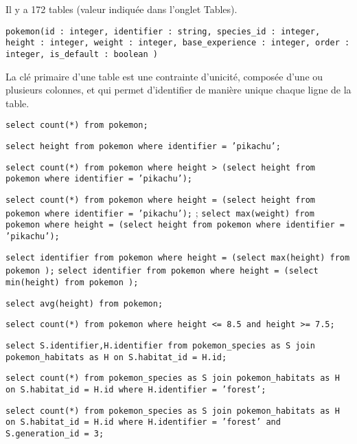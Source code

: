 \question{}
Il y a 172 tables (valeur indiquée dans l'onglet Tables).

\question{}
\texttt{pokemon(id : integer, identifier : string, species\_id : integer, height : integer, weight : integer, base\_experience : integer, order : integer, is\_default : boolean )} 

\question{}
La clé primaire d'une table est une contrainte d'unicité, composée d'une ou plusieurs colonnes, et qui permet d'identifier de manière unique chaque ligne de la table.


\question{}
\texttt{select count(*) from pokemon;}  

\question{}
\texttt{select height from pokemon where identifier = 'pikachu';}  

\question{}
\texttt{select count(*) from pokemon where height > (select height from pokemon where identifier = 'pikachu');}  

\question{}
\texttt{select count(*) from pokemon where height = (select height from pokemon where identifier = 'pikachu');}  ;
\texttt{select max(weight) from pokemon where height = (select height from pokemon where identifier = 'pikachu');} 

\question{}
\texttt{select identifier from pokemon where height = (select max(height) from pokemon );} 
\texttt{select identifier from pokemon where height = (select min(height) from pokemon );}  

\question{}
\texttt{select avg(height) from pokemon;} 


\question{}
 \texttt{select count(*) from pokemon where height <= 8.5 and height >= 7.5;}  

\question{}
\texttt{select S.identifier,H.identifier from pokemon\_species as S join pokemon\_habitats as H on S.habitat\_id = H.id;}

\question{}
\texttt{select count(*) from pokemon\_species as S join pokemon\_habitats as H on S.habitat\_id = H.id where H.identifier = 'forest';}   


\question{}
\texttt{select count(*) from pokemon\_species as S join pokemon\_habitats as H on S.habitat\_id = H.id where H.identifier = 'forest' and S.generation\_id = 3;} 


